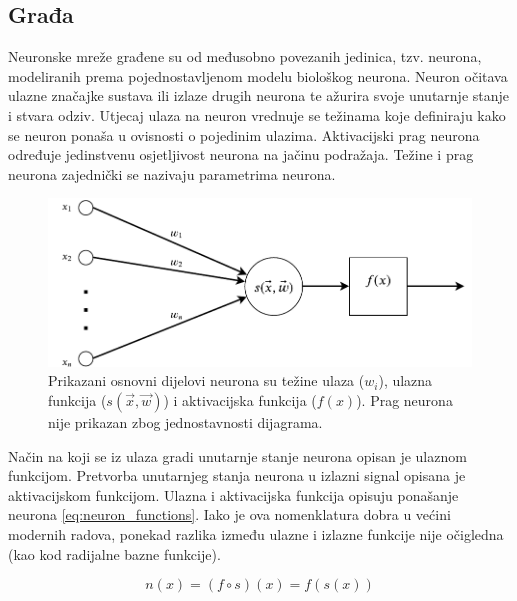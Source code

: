 \documentclass[times, utf8, numeric, diplomski]{fer}
\begin{document}
\subsection{Građa}
Neuronske mreže građene su od međusobno povezanih jedinica, tzv. neurona, modeliranih prema pojednostavljenom modelu biološkog neurona. Neuron očitava ulazne značajke sustava ili izlaze drugih neurona te ažurira svoje unutarnje stanje i stvara odziv. Utjecaj ulaza na neuron vrednuje se težinama  koje definiraju kako se neuron ponaša u ovisnosti o pojedinim ulazima. Aktivacijski prag neurona  određuje jedinstvenu osjetljivost neurona na jačinu podražaja. Težine i prag neurona zajednički se nazivaju parametrima neurona.

\begin{figure}[h]
\centering
\includegraphics[scale=0.7]{Neuron.pdf}
\caption{Prikazani osnovni dijelovi neurona su težine ulaza ($w_i$), ulazna funkcija ($s(\vec{x},\vec{w})$) i aktivacijska funkcija ($f(x)$). Prag neurona nije prikazan zbog jednostavnosti dijagrama.}
\label{fig:neuron}
\end{figure}

Način na koji se iz ulaza gradi unutarnje stanje neurona opisan je ulaznom funkcijom. Pretvorba unutarnjeg stanja neurona u izlazni signal opisana je aktivacijskom funkcijom. Ulazna i aktivacijska funkcija opisuju ponašanje neurona \eqref{eq:neuron_functions}. Iako je ova nomenklatura dobra u većini modernih radova, ponekad razlika između ulazne i izlazne funkcije nije očigledna (kao kod radijalne bazne funkcije).

\begin{equation}
\label{eq:neuron_functions}
n(x) = (f \circ s)(x) = f(s(x))
\end{equation}

\newpage
\end{document}
